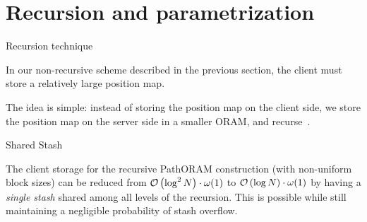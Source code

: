 
\section{Recursion and parametrization}

	\begin{frame}{Recursion technique}
		
		In our non-recursive scheme described in the previous section, the client must store a relatively large position map.

		The idea is simple: instead	of storing the position map on the client side, we store the position map on the server side in a smaller ORAM, and recurse~\cite{Shi:2011, DBLP:journals/corr/abs-1106-3652}.

	\end{frame}

	\begin{frame}{Shared Stash}
		
		The client storage for the recursive PathORAM construction (with non-uniform block sizes) can be reduced from $\mathcal{O}\left(\log^2 N\right) \cdot \omega (1)$ to $\mathcal{O}\left(\log N\right) \cdot \omega (1)$ by having a \emph{single stash} shared among all levels of the recursion. 
		This is possible while still maintaining a negligible probability of stash overflow.

	\end{frame}
